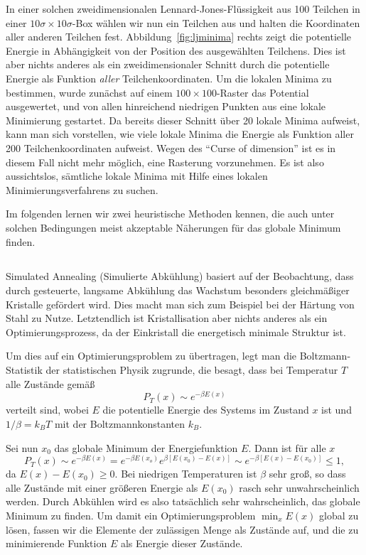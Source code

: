 In einer solchen zweidimensionalen Lennard-Jones-Flüssigkeit aus 100
Teilchen in einer $10\sigma\times 10\sigma$-Box wählen wir nun ein
Teilchen aus und halten die Koordinaten aller anderen Teilchen
fest. Abbildung~\ref{fig:ljminima} rechts zeigt die potentielle
Energie in Abhängigkeit von der Position des ausgewählten
Teilchens. Dies ist aber nichts anderes als ein zweidimensionaler
Schnitt durch die potentielle Energie als Funktion \emph{aller}
Teilchenkoordinaten. Um die lokalen Minima zu bestimmen, wurde
zunächst auf einem $100\times 100$-Raster das Potential ausgewertet,
und von allen hinreichend niedrigen Punkten aus eine lokale
Minimierung gestartet. Da bereits dieser Schnitt über 20 lokale Minima
aufweist, kann man sich vorstellen, wie viele lokale Minima die
Energie als Funktion aller 200 Teilchenkoordinaten aufweist.  Wegen
des ``Curse of dimension'' ist es in diesem Fall nicht mehr möglich,
eine Rasterung vorzunehmen. Es ist also aussichtslos, sämtliche lokale
Minima mit Hilfe eines lokalen Minimierungsverfahrens zu suchen.

Im folgenden lernen wir zwei heuristische Methoden kennen, die auch
unter solchen Bedingungen meist akzeptable Näherungen für das globale
Minimum finden.

\subsection{}

Simulated Annealing (Simulierte Abkühlung) basiert auf der
Beobachtung, dass durch gesteuerte, langsame Abkühlung das Wachstum
besonders gleichmäßiger Kristalle gefördert wird. Dies macht man sich
zum Beispiel bei der Härtung von Stahl zu Nutze. Letztendlich ist
Kristallisation aber nichts anderes als ein Optimierungsprozess, da
der Einkristall die energetisch minimale Struktur ist.

Um dies auf ein Optimierungsproblem zu übertragen, legt man die
Boltzmann-Statistik der statistischen Physik zugrunde, die besagt,
dass bei Temperatur $T$ alle Zustände gemäß
\begin{equation}
  P_T(x)\sim e^{-\beta E(x)}
\end{equation}
verteilt sind, wobei $E$ die potentielle Energie des Systems im
Zustand $x$ ist und $1/\beta=k_BT$ mit der Boltzmannkonstanten $k_B$.

Sei nun $x_0$ das globale Minimum der Energiefunktion $E$. Dann ist
für alle $x$
\begin{equation}
  P_T(x)\sim e^{-\beta E(x)} = e^{-\beta E(x_o)}e^{\beta [E(x_0) - E(x)]}
  \sim e^{-\beta [E(x) - E(x_0)]} \le 1,
\end{equation}
da $E(x) - E(x_0)\ge 0$. Bei niedrigen Temperaturen ist $\beta$ sehr
groß, so dass alle Zustände mit einer größeren Energie als $E(x_0)$
rasch sehr unwahrscheinlich werden. Durch Abkühlen wird es also
tatsächlich sehr wahrscheinlich, das globale Minimum zu finden. Um
damit ein Optimierungsproblem $\min_{x} E(x)$ global zu lösen, fassen
wir die Elemente der zulässigen Menge als Zustände auf, und die zu
minimierende Funktion $E$ als Energie dieser Zustände.

